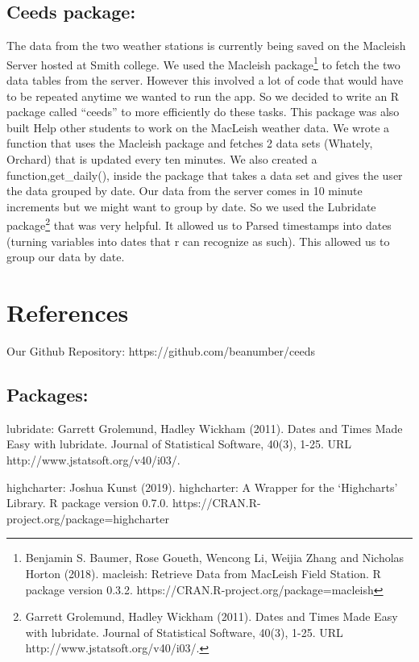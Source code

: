 \documentclass[10pt,letterpaper]{article}
\begin{document}
\subsection{Ceeds package:}\label{ceeds-package}

The data from the two weather stations is currently being saved on the
Macleish Server hosted at Smith college. We used the Macleish
package\footnote{Benjamin S. Baumer, Rose Goueth, Wencong Li, Weijia
  Zhang and Nicholas Horton (2018). macleish: Retrieve Data from
  MacLeish Field Station. R package version 0.3.2.
  https://CRAN.R-project.org/package=macleish} to fetch the two data
tables from the server. However this involved a lot of code that would
have to be repeated anytime we wanted to run the app. So we decided to
write an R package called ``ceeds'' to more efficiently do these tasks.
This package was also built Help other students to work on the MacLeish
weather data. We wrote a function that uses the Macleish package and
fetches 2 data sets (Whately, Orchard) that is updated every ten
minutes. We also created a function,get\_daily(), inside the package
that takes a data set and gives the user the data grouped by date. Our
data from the server comes in 10 minute increments but we might want to
group by date. So we used the Lubridate package\footnote{Garrett
  Grolemund, Hadley Wickham (2011). Dates and Times Made Easy with
  lubridate. Journal of Statistical Software, 40(3), 1-25. URL
  http://www.jstatsoft.org/v40/i03/.} that was very helpful. It allowed
us to Parsed timestamps into dates (turning variables into dates that r
can recognize as such). This allowed us to group our data by date.

\section*{References}\label{references}

Our Github Repository: https://github.com/beanumber/ceeds

\subsection{Packages:}\label{packages}

lubridate: Garrett Grolemund, Hadley Wickham (2011). Dates and Times
Made Easy with lubridate. Journal of Statistical Software, 40(3), 1-25.
URL http://www.jstatsoft.org/v40/i03/.

highcharter: Joshua Kunst (2019). highcharter: A Wrapper for the
`Highcharts' Library. R package version 0.7.0.
https://CRAN.R-project.org/package=highcharter
\end{document}
